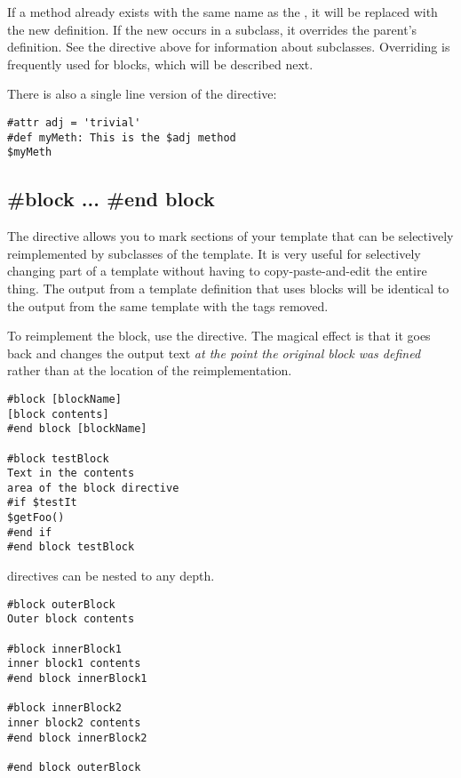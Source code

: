 If a method already exists with the same name as the , it will be replaced
with the new definition.  If the new  occurs in a subclass, it overrides the
parent's definition.  See the  directive above for information about
subclasses.  Overriding is frequently used for blocks, which will be described next.

There is also a single line version of the  directive:

\begin{verbatim}
#attr adj = 'trivial'
#def myMeth: This is the $adj method 
$myMeth
\end{verbatim}


\subsection{\#block ... \#end block}
\label{inheritanceEtc.block}

The  directive allows you to mark sections of your template
that can be selectively reimplemented by subclasses of the template.  It is
very useful for selectively changing part of a template without having to
copy-paste-and-edit the entire thing.  The output from a template definition
that uses blocks will be identical to the output from the same template with
the  tags removed. 

To reimplement the block, use the  directive.  The magical effect is that it
goes back and changes the output text {\em at the point the original block was
defined} rather than at the location of the reimplementation.

\begin{verbatim}
#block [blockName] 
[block contents] 
#end block [blockName]

#block testBlock
Text in the contents 
area of the block directive
#if $testIt
$getFoo() 
#end if
#end block testBlock
\end{verbatim}

 directives can be nested to any depth.

\begin{verbatim}
#block outerBlock
Outer block contents 

#block innerBlock1
inner block1 contents 
#end block innerBlock1

#block innerBlock2
inner block2 contents 
#end block innerBlock2

#end block outerBlock
\end{verbatim}

